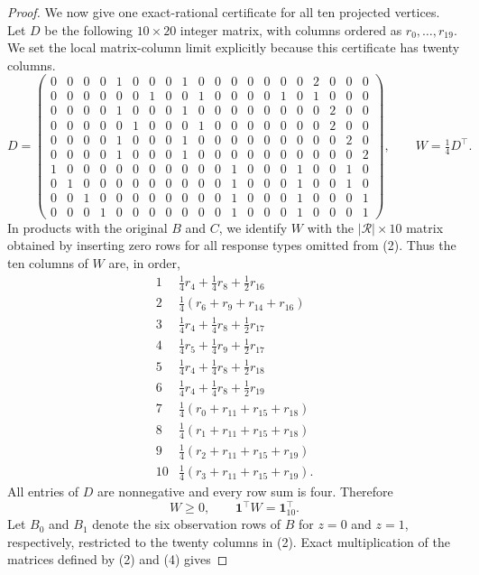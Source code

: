 \documentclass{article}
\begin{document}
\begin{proof}
We now give one exact-rational certificate for all ten projected vertices.  Let \(D\) be the following \(10\times20\) integer matrix, with columns ordered as \(r_0,\ldots,r_{19}\).  We set the local matrix-column limit explicitly because this certificate has twenty columns.
\setcounter{MaxMatrixCols}{20}
{\scriptsize
\[
D=
\begin{pmatrix}
0&0&0&0&1&0&0&0&1&0&0&0&0&0&0&0&2&0&0&0\\
0&0&0&0&0&0&1&0&0&1&0&0&0&0&1&0&1&0&0&0\\
0&0&0&0&1&0&0&0&1&0&0&0&0&0&0&0&0&2&0&0\\
0&0&0&0&0&1&0&0&0&1&0&0&0&0&0&0&0&2&0&0\\
0&0&0&0&1&0&0&0&1&0&0&0&0&0&0&0&0&0&2&0\\
0&0&0&0&1&0&0&0&1&0&0&0&0&0&0&0&0&0&0&2\\
1&0&0&0&0&0&0&0&0&0&0&1&0&0&0&1&0&0&1&0\\
0&1&0&0&0&0&0&0&0&0&0&1&0&0&0&1&0&0&1&0\\
0&0&1&0&0&0&0&0&0&0&0&1&0&0&0&1&0&0&0&1\\
0&0&0&1&0&0&0&0&0&0&0&1&0&0&0&1&0&0&0&1
\end{pmatrix},
\qquad W=\tfrac14D^\top.
\tag{4}
\]
}
In products with the original \(B\) and \(C\), we identify \(W\) with the \(|\mathcal R|\times10\) matrix obtained by inserting zero rows for all response types omitted from (2).
Thus the ten columns of \(W\) are, in order,
\[
\begin{array}{c|l}
1&\tfrac14r_4+\tfrac14r_8+\tfrac12r_{16}\\
2&\tfrac14(r_6+r_9+r_{14}+r_{16})\\
3&\tfrac14r_4+\tfrac14r_8+\tfrac12r_{17}\\
4&\tfrac14r_5+\tfrac14r_9+\tfrac12r_{17}\\
5&\tfrac14r_4+\tfrac14r_8+\tfrac12r_{18}\\
6&\tfrac14r_4+\tfrac14r_8+\tfrac12r_{19}\\
7&\tfrac14(r_0+r_{11}+r_{15}+r_{18})\\
8&\tfrac14(r_1+r_{11}+r_{15}+r_{18})\\
9&\tfrac14(r_2+r_{11}+r_{15}+r_{19})\\
10&\tfrac14(r_3+r_{11}+r_{15}+r_{19}).
\end{array}
\tag{5}
\]
All entries of \(D\) are nonnegative and every row sum is four.  Therefore
\[
 W\geq0,
 \qquad
 \mathbf 1^\top W=\mathbf 1_{10}^\top.
 \tag{6}
\]
Let \(B_0\) and \(B_1\) denote the six observation rows of \(B\) for \(z=0\) and \(z=1\), respectively, restricted to the twenty columns in (2).  Exact multiplication of the matrices defined by (2) and (4) gives

\end{proof}
\end{document}
